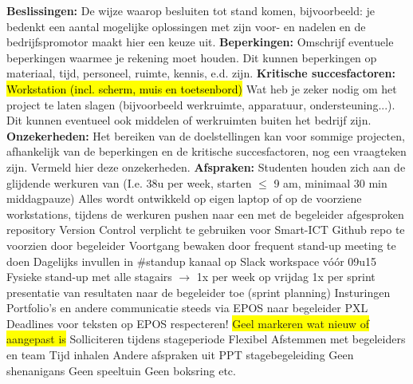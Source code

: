 
  \begin{outline}
  \1 \textbf{Beslissingen:}
    \2[] De wijze waarop besluiten tot stand komen, bijvoorbeeld: je bedenkt een aantal mogelijke oplossingen met zijn voor- en nadelen en de bedrijfspromotor maakt hier een keuze uit.
  \1 \textbf{Beperkingen:}
    \2[] Omschrijf eventuele beperkingen waarmee je rekening moet houden. Dit kunnen beperkingen op materiaal, tijd, personeel, ruimte, kennis, e.d. zijn.
  \1 \textbf{Kritische succesfactoren:}
    \2 \hl{Workstation (incl. scherm, muis en toetsenbord)}
    \2[] Wat heb je zeker nodig om het project te laten slagen (bijvoorbeeld werkruimte, apparatuur, ondersteuning...). Dit kunnen eventueel ook middelen of werkruimten buiten het bedrijf zijn.
  \1 \textbf{Onzekerheden:}
    \2[] Het bereiken van de doelstellingen kan voor sommige projecten, afhankelijk van de beperkingen en de kritische succesfactoren, nog een vraagteken zijn. Vermeld hier deze onzekerheden.
  \1 \textbf{Afspraken:}
    \2 Studenten houden zich aan de glijdende werkuren van \stagebedrijf{} (I.e. 38u per week, starten $\leq$ 9 am, minimaal 30 min middagpauze)
    \2 Alles wordt ontwikkeld op eigen laptop of op de voorziene workstations, tijdens de werkuren pushen naar een met de begeleider afgesproken repository
      \3 Version Control verplicht te gebruiken voor Smart-ICT
      \3 Github repo te voorzien door begeleider
    \2 Voortgang bewaken door frequent stand-up meeting te doen
      \3 Dagelijks invullen in $\#$standup kanaal op Slack workspace vóór 09u15
      \3 Fysieke stand-up met alle stagairs $\rightarrow$ 1x per week op vrijdag
    \2 1x per sprint presentatie van resultaten naar de begeleider toe (sprint planning)
    \2 Insturingen
      \3 Portfolio’s en andere communicatie steeds via EPOS naar begeleider PXL 
      \3 Deadlines voor teksten op EPOS respecteren! 
      \3 \colorbox{yellow}{Geel markeren wat nieuw of aangepast is}
    \2 Solliciteren tijdens stageperiode
      \3 Flexibel
      \3 Afstemmen met begeleiders en team
      \3 Tijd inhalen
      \3 Andere afspraken uit PPT stagebegeleiding
    \2 Geen shenanigans
      \3 Geen speeltuin
      \3 Geen boksring
      \3 etc.
\end{outline}